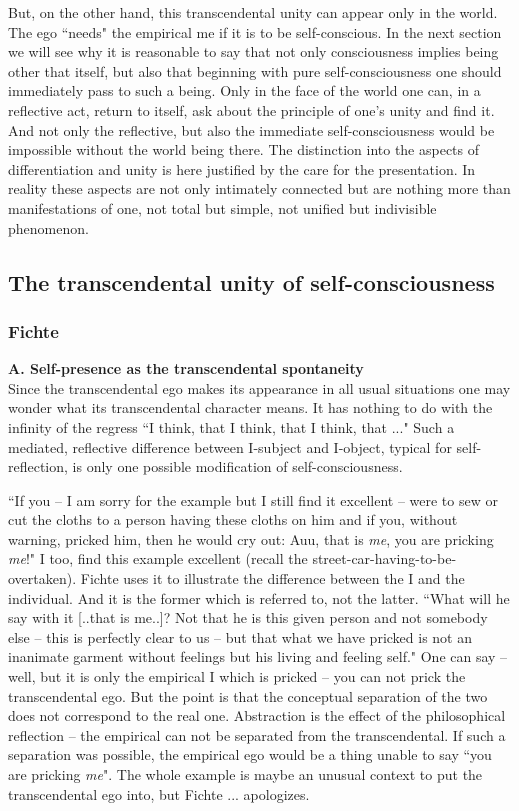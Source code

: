 But, on the other hand, this transcendental unity can appear only in the world. The ego ``needs" the empirical me 
if it is to be self-conscious. In the next section we will see why it is reasonable to say that not only consciousness 
implies being other that itself, but also that beginning with pure self-consciousness one should immediately pass 
to such a being. Only in the face of the world one can, in a reflective act, return to itself, ask about the principle of 
one's unity and find it. And not only the reflective, but also the immediate self-consciousness would be impossible 
without the world being there. The distinction into the aspects of differentiation and unity is here justified by the 
care for the presentation. In reality these aspects are not only intimately connected but are nothing more than 
manifestations of one, not total but simple, not unified but indivisible phenomenon.

\subsection{The transcendental unity of self-consciousness}\label{su:unity}

\subsubsection{ Fichte}\label{transcFichte}
{\bf A. Self-presence as the transcendental spontaneity} \\
Since the transcendental ego makes its appearance in all usual situations one may wonder what 
its transcendental character means. It has nothing to do with the infinity of the regress ``I think, that I think, that I 
think, that ..." Such a mediated, reflective difference between I-subject and I-object, 
typical for self-reflection, is only one possible modification of self-consciousness. 

``If you -- I am sorry for the example but I still find it excellent -- were to sew or cut the cloths to a person having 
these cloths on him and if you, without warning, pricked him, then he would cry out: Auu, that is {\em me}, you are 
pricking {\em me}!" \cite{ITS} I too, find this example excellent (recall the street-car-having-to-be-overtaken).
Fichte uses it to illustrate the difference between the I and the 
individual. And it is the former which is referred to, not the latter. ``What will he say with it [..that is me..]? Not 
that he is this given person and not somebody else -- this is perfectly clear to us -- but that  what we have 
pricked is not an inanimate garment without feelings but his living and feeling self." \cite{ITS} One can say -- well, but it is 
only the empirical I which is pricked -- you can not prick the transcendental ego.
But the point is that the 
conceptual separation of the two does not correspond to the real one. Abstraction is the effect of the philosophical 
reflection -- the empirical can not be separated from the transcendental. If such a separation was possible, the 
empirical ego would be a thing unable to say ``you are pricking {\em me}". The whole example is maybe an unusual 
context to put the transcendental ego into, but Fichte ... apologizes.

